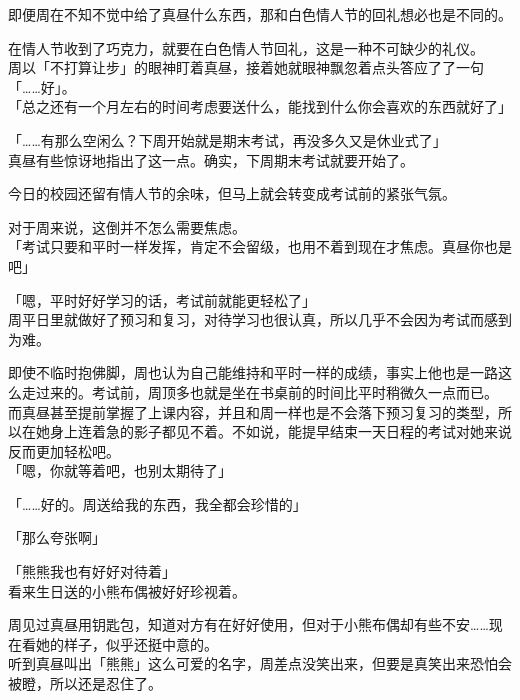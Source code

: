 即便周在不知不觉中给了真昼什么东西，那和白色情人节的回礼想必也是不同的。

在情人节收到了巧克力，就要在白色情人节回礼，这是一种不可缺少的礼仪。\\

周以「不打算让步」的眼神盯着真昼，接着她就眼神飘忽着点头答应了了一句「……好」。\\

「总之还有一个月左右的时间考虑要送什么，能找到什么你会喜欢的东西就好了」

「……有那么空闲么？下周开始就是期末考试，再没多久又是休业式了」\\

真昼有些惊讶地指出了这一点。确实，下周期末考试就要开始了。

今日的校园还留有情人节的余味，但马上就会转变成考试前的紧张气氛。

对于周来说，这倒并不怎么需要焦虑。\\

「考试只要和平时一样发挥，肯定不会留级，也用不着到现在才焦虑。真昼你也是吧」

「嗯，平时好好学习的话，考试前就能更轻松了」\\

周平日里就做好了预习和复习，对待学习也很认真，所以几乎不会因为考试而感到为难。

即使不临时抱佛脚，周也认为自己能维持和平时一样的成绩，事实上他也是一路这么走过来的。考试前，周顶多也就是坐在书桌前的时间比平时稍微久一点而已。\\

而真昼甚至提前掌握了上课内容，并且和周一样也是不会落下预习复习的类型，所以在她身上连着急的影子都见不着。不如说，能提早结束一天日程的考试对她来说反而更加轻松吧。\\

「嗯，你就等着吧，也别太期待了」

「……好的。周送给我的东西，我全都会珍惜的」

「那么夸张啊」

「熊熊我也有好好对待着」\\

看来生日送的小熊布偶被好好珍视着。

周见过真昼用钥匙包，知道对方有在好好使用，但对于小熊布偶却有些不安……现在看她的样子，似乎还挺中意的。\\

听到真昼叫出「熊熊」这么可爱的名字，周差点没笑出来，但要是真笑出来恐怕会被瞪，所以还是忍住了。\\

